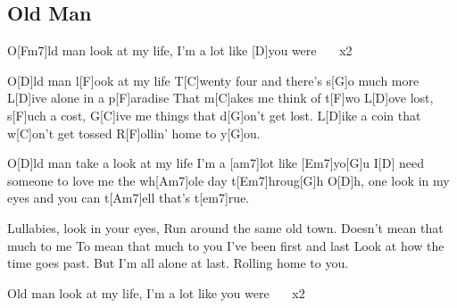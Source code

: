 \subsection*{Old Man   }
\begin{guitar}
 O[Fm7]ld man look at my life, I'm a lot like [D]you were \ \ \ x2


              
O[D]ld man l[F]ook at my life 
T[C]wenty four and there's s[G]o much more
L[D]ive alone in a p[F]aradise
That m[C]akes me think of t[F]wo
L[D]ove lost, s[F]uch a cost,
G[C]ive me things that d[G]on't get lost.
L[D]ike a coin that w[C]on't get tossed
R[F]ollin' home to y[G]ou.


O[D]ld man take a look at my life I'm a [am7]lot like [Em7]yo[G]u 
I[D] need someone to love me the wh[Am7]ole day t[Em7]hroug[G]h 
O[D]h, one look in my eyes and you can t[Am7]ell that's t[em7]rue.


Lullabies, look in your eyes,
Run around the same old town.
Doesn't mean that much to me 
To mean that much to you
I've been first and last
Look at how the time goes past.
But I'm all alone at last.
Rolling home to you.

Old man look at my life, I'm a lot like you were \ \ \ x2 



\end{guitar}
